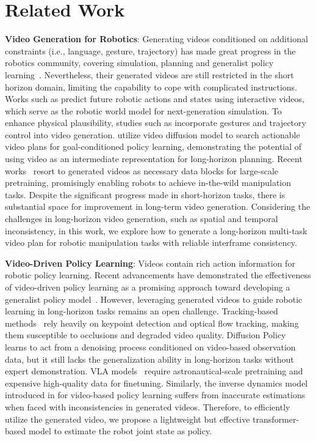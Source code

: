 \section{Related Work}

{\parskip=2pt
\noindent\textbf{Video Generation for Robotics}: Generating videos conditioned on additional constraints (i.e., language, gesture, trajectory) has made great progress in the robotics community, covering simulation, planning and generalist policy learning~\cite{vlp,thisnthat,robodreamer, unipi, gr2, unisim,genie,gen2act,irasim}. 
Nevertheless, their generated videos are still restricted in the short horizon domain, limiting the capability to cope with complicated instructions. Works such as 
\cite{unisim,genie} predict future robotic actions and states using interactive videos, which serve as the robotic world model for next-generation simulation.
To enhance physical plausibility, studies such as \cite{thisnthat,irasim} incorporate gestures and trajectory control into video generation. 
\cite{vlp,unipi} utilize video diffusion model to search actionable video plans for goal-conditioned policy learning, demonstrating the potential of using video as an intermediate representation for long-horizon planning. Recent works~\cite{gr2,gen2act} resort to generated videos as necessary data blocks for large-scale pretraining, promisingly enabling robots to achieve in-the-wild manipulation tasks. Despite the significant progress made in short-horizon tasks, there is substantial space for improvement in long-term video generation. Considering the challenges in long-horizon video generation, such as spatial and temporal inconsistency, in this work, we explore how to generate a long-horizon multi-task video plan for robotic manipulation tasks with reliable interframe consistency.}

{\parskip=2pt
\noindent\textbf{Video-Driven Policy Learning}: Videos contain rich action information for robotic policy learning. Recent advancements have demonstrated the effectiveness of video-driven policy learning as a promising approach toward developing a generalist policy model~\cite{rdtb,pi_0,diffpolicy,avdc,anypoint}. However, leveraging generated videos to guide robotic learning in long-horizon tasks remains an open challenge. Tracking-based methods~\cite{track2act,avdc,anypoint} rely heavily on keypoint detection and optical flow tracking, making them susceptible to occlusions and degraded video quality. Diffusion Policy~\cite{diffpolicy} learns to act from a denoising process conditioned on video-based observation data, but it still lacks the generalization ability in long-horizon tasks without expert demonstration. VLA models~\cite{rdtb,pi_0} require astronautical-scale pretraining and expensive high-quality data for finetuning.  Similarly, the inverse dynamics model introduced in \cite{unipi} for video-based policy learning suffers from inaccurate estimations when faced with inconsistencies in generated videos. Therefore, to efficiently utilize the generated video, we propose a lightweight but effective transformer-based model to estimate the robot joint state as policy.}

